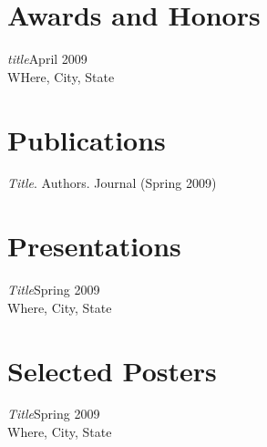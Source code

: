 \documentclass[10pt]{article}
\begin{document}
\section{\textbf{\large Awards and Honors}}\textit{title}\hfill April 2009\\WHere, City, State\vspace{0.5\baselineskip}





\section{\textbf{\large Publications}}\textit{Title}. Authors. Journal (Spring 2009)\vspace{0.5\baselineskip}





\section{\textbf{\large Presentations}}\textit{Title}\hfill Spring 2009\\Where, City, State\vspace{0.5\baselineskip}





\section{\textbf{\large Selected Posters}}\textit{Title}\hfill Spring 2009\\Where, City, State\vspace{0.5\baselineskip}








\end{document}
